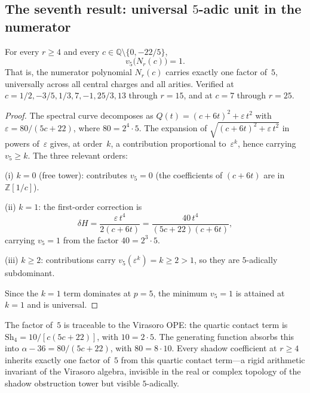 \documentclass[11pt]{article}
\newcommand{\Z}{\mathbb{Z}}
\newcommand{\Q}{\mathbb{Q}}
\begin{document}
\subsection*{The seventh result: universal $5$-adic unit
in the numerator}

\begin{theorem}
\label{thm:universal-5-unit}
For every $r \ge 4$ and every
$c \in \Q \setminus \{0, -22/5\}$,
\[
v_5\bigl(N_r(c)\bigr) = 1.
\]
That is, the numerator polynomial $N_r(c)$ carries exactly one
factor of~$5$, universally across all central charges and all
arities.  Verified at
$c = 1/2, -3/5, 1/3, 7, -1, 25/3, 13$ through $r = 15$,
and at $c = 7$ through $r = 25$.
\end{theorem}

\begin{proof}
The spectral curve decomposes as
$Q(t) = (c + 6t)^2 + \varepsilon\,t^2$ with
$\varepsilon = 80/(5c + 22)$, where $80 = 2^4 \cdot 5$.
The expansion of $\sqrt{(c + 6t)^2 + \varepsilon\,t^2}$
in powers of~$\varepsilon$ gives, at order~$k$, a
contribution proportional to~$\varepsilon^k$, hence carrying
$v_5 \ge k$.  The three relevant orders:

\smallskip
\noindent(i) $k = 0$ (free tower): contributes
$v_5 = 0$ (the coefficients of $(c + 6t)$ are in
$\Z[1/c]$).

\noindent(ii) $k = 1$: the first-order correction is
\[
\delta H
= \frac{\varepsilon\,t^4}{2(c + 6t)}
= \frac{40\,t^4}{(5c + 22)(c + 6t)},
\]
carrying $v_5 = 1$ from the factor $40 = 2^3 \cdot 5$.

\noindent(iii) $k \ge 2$: contributions carry
$v_5(\varepsilon^k) = k \ge 2 > 1$, so they are
$5$-adically subdominant.

\smallskip
Since the $k = 1$ term dominates at $p = 5$, the minimum
$v_5 = 1$ is attained at $k = 1$ and is universal.
\end{proof}

\begin{remark}
The factor of~$5$ is traceable to the Virasoro OPE: the
quartic contact term is
$\mathrm{Sh}_4 = 10/[c(5c + 22)]$, with
$10 = 2 \cdot 5$.  The generating function absorbs this
into $\alpha - 36 = 80/(5c + 22)$, with
$80 = 8 \cdot 10$.  Every shadow coefficient at
$r \ge 4$ inherits exactly one factor of~$5$ from this
quartic contact term---a rigid arithmetic invariant of the
Virasoro algebra, invisible in the real or complex topology
of the shadow obstruction tower but visible $5$-adically.
\end{remark}
\end{document}

